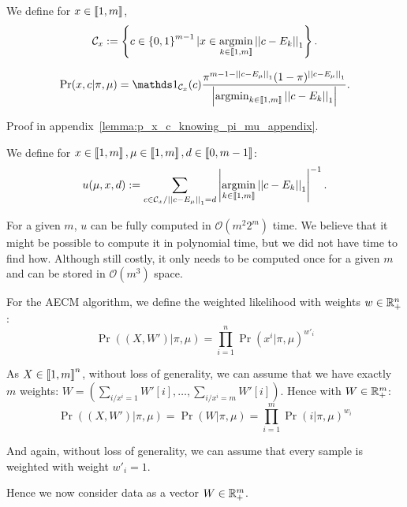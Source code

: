 We define for $x \in \left\llbracket1, m\right\rrbracket$, 
\[ \mathcal{C}_x := \left\{ c \in \left\{ 0, 1 \right\}^{m-1} | x \in \operatorname*{argmin}_{k \in \left\llbracket1, m\right\rrbracket} \left|\left|c - E_k\right|\right|_1  \right\} .\]

\begin{lemma}
    \label{lemma:p_x_c_knowing_pi_mu}
    \[\Pr(x, c | \pi, \mu) = \indic{}_{\mathcal{C}_x}(c) \frac{\pi^{m - 1 - \norm{c - E_{\mu}}_1} (1 - \pi)^{\norm{c - E_{\mu}}_1}}{\card{\argmin_{k \in \bbrack{1, m}} \norm{c - E_k}_1}} .\]
\end{lemma}

Proof in appendix~\ref{lemma:p_x_c_knowing_pi_mu_appendix}.


\begin{definition}
    We define for $x \in \left\llbracket1, m\right\rrbracket, \mu \in \left\llbracket1, m\right\rrbracket, d \in \left\llbracket0, m-1\right\rrbracket$:
    \[ u(\mu, x, d) := \sum_{c \in \mathcal{C}_x / \left|\left|c - E_{\mu}\right|\right|_1 = d}  \left|\operatorname*{argmin}_{k \in \left\llbracket1, m\right\rrbracket} \left|\left|c - E_k\right|\right|_1\right|^{-1} .\]
\end{definition}

For a given $m$, $u$ can be fully computed in $\mathcal O(m^2 2^m)$ time. We believe that it might be possible to compute it in polynomial time, but we did not have time to find how. Although still costly, it only needs to be computed once for a given $m$ and can be stored in $\mathcal O(m^3)$ space.

\begin{definition}
    For the AECM algorithm, we define the weighted likelihood with weights $w \in \mathbb{R}_+^n$:
    \[ \Pr((X, W') | \pi, \mu) = \prod_{i=1}^{n} \Pr(x^i | \pi, \mu)^{w'_i} \]

    As  $X \in \left\llbracket1, m\right\rrbracket^n$, without loss of generality, we can assume that we have exactly $m$ weights: $W = (\sum_{i / x^i = 1} W'[i], \dots, \sum_{i / x^i = m} W'[i])$. Hence with $W \in \mathbb{R}_+^m$:
    \[ \Pr((X, W') | \pi, \mu) = \Pr(W | \pi, \mu) = \prod_{i=1}^{m} \Pr(i | \pi, \mu)^{w_i} \]

    And again, without loss of generality, we can assume that every sample is weighted with weight $w'_i = 1$.

    Hence we now consider data as a vector $W \in \mathbb{R}_+^m$.
\end{definition}

